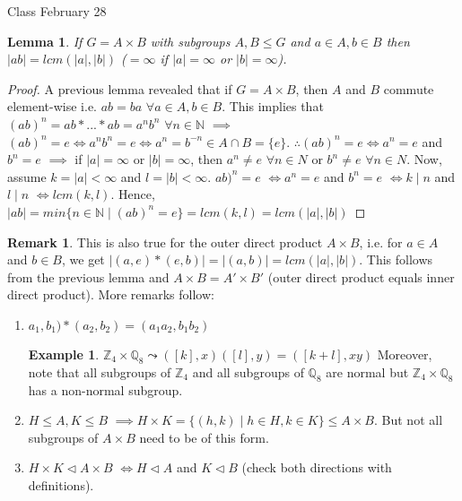 \documentclass[11pt]{article}
\newtheorem{lem}[thm]{Lemma}
\theoremstyle{definition}
\newtheorem{example}[thm]{Example}
\newtheorem{rem}[thm]{Remark}
\numberwithin{equation}{section}
\newcommand{\Q}{\mathbb{Q}}  %
\newcommand{\Z}{\mathbb{Z}}
\newcommand{\N}{\mathbb{N}} %
\begin{document}
\begin{center}
{\sf\LARGE Class February 28}
\end{center}

\begin{lem}
If $G = A \times B$ with subgroups $A, B \leq G$ and $a \in A, b \in B$ then $|ab| = lcm(|a|, |b|)$  ($= \infty$ if $|a| = \infty$ or $|b| = \infty$).
\end{lem}
\begin{proof}
A previous lemma revealed that if $G = A \times B$, then $A$ and $B$ commute element-wise i.e. $ab = ba$ $\forall a \in A, b \in B$. This implies that $(ab)^{n} = ab*...*ab = a^{n}b^{n}$ $\forall n \in \N$ $\implies$ $(ab)^{n} = e \Leftrightarrow  a^{n}b^{n} = e \Leftrightarrow a^{n} = b^{-n} \in A \cap B = \{e\}$. $\therefore (ab)^{n} = e \Leftrightarrow a^n = e$ and $b^n = e$ $\implies$ if $|a| = \infty$ or $|b| = \infty$, then $a^{n} \neq e$ $\forall n \in N$ or $b^{n} \neq e$ $\forall n \in N$. Now, assume $k = |a| < \infty$ and $l = |b| < \infty$. $ab)^{n} = e$ $\Leftrightarrow a^n = e$ and $b^n = e$ $\Leftrightarrow k \mid n$ and $l \mid n$ $\Leftrightarrow lcm(k, l)$. Hence, $|ab| = min\{n \in \N \mid (ab)^{n} = e \} = lcm(k, l) = lcm(|a|, |b|)$
\end{proof}
\begin{rem}
This is also true for the outer direct product $A \times B$, i.e. for $a \in A$ and $b \in B$, we get $|(a, e) * (e, b)| = |(a, b)| = lcm(|a|, |b|)$. This follows from the previous lemma and $A \times B = A' \times B'$ (outer direct product equals inner direct product). More remarks follow:
\begin{enumerate}
    \item $a_1, b_1) * (a_2, b_2) = (a_{1}a_{2}, b_{1}b_{2})$
    \begin{example}
    $\Z_4 \times \Q_8 \leadsto ([k], x)([l], y) = ([k + l], xy)$ Moreover, note that all subgroups of $\Z_4$ and all subgroups of $\Q_8$ are normal but $\Z_4 \times \Q_8$ has a non-normal subgroup.
    \end{example}
    \item $H \leq A, K \leq B$ $\implies H \times K = \{(h, k) \mid h \in H, k \in K\} \leq A \times B$. But not all subgroups of $A \times B$ need to be of this form.
    \item $H \times K \vartriangleleft A \times B$ $\Leftrightarrow H \vartriangleleft A$ and $K \vartriangleleft B$ (check both directions with definitions).
\end{enumerate}
\end{rem}
\end{document}
